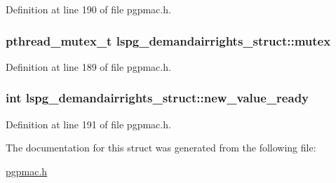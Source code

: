 Definition at line 190 of file pgpmac.\-h.

\hypertarget{structlspg__demandairrights__struct_a874970af767d4bb329f9764075b30096}{
\subsubsection[{mutex}]{\setlength{\rightskip}{0pt plus 5cm}pthread\-\_\-mutex\-\_\-t lspg\-\_\-demandairrights\-\_\-struct\-::mutex}}\label{structlspg__demandairrights__struct_a874970af767d4bb329f9764075b30096}


Definition at line 189 of file pgpmac.\-h.

\hypertarget{structlspg__demandairrights__struct_ad686c9a04d0c7e10b236c234eaf03ce7}{
\subsubsection[{new\-\_\-value\-\_\-ready}]{\setlength{\rightskip}{0pt plus 5cm}int lspg\-\_\-demandairrights\-\_\-struct\-::new\-\_\-value\-\_\-ready}}\label{structlspg__demandairrights__struct_ad686c9a04d0c7e10b236c234eaf03ce7}


Definition at line 191 of file pgpmac.\-h.



The documentation for this struct was generated from the following file\-:\begin{DoxyCompactItemize}
\item 
\hyperlink{pgpmac_8h}{pgpmac.\-h}\end{DoxyCompactItemize}
